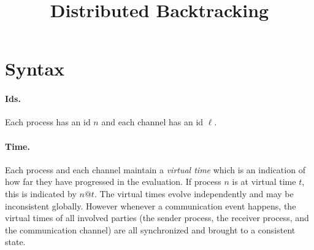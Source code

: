 \documentclass{article}
\title{Distributed Backtracking}
\author{}
\date{}
\begin{document}
\maketitle

\newcommand{\alt}{~|~}
\newcommand{\parc}[2]{#1 \,\|\, #2}
\newcommand{\send}[2]{\texttt{send}~#1~#2}
\newcommand{\stable}[1]{\texttt{stable}~#1}
\newcommand{\stableu}[1]{\underline{\texttt{stable}}~#1}
\newcommand{\backtrack}[1]{\texttt{backtrack}~#1}
\newcommand{\recv}[4]{\texttt{recv}~(#1.#2) \talloblong (#3.#4)}
\newcommand{\proc}[4]{\langle #1@#4:~ #2,#3 \rangle}

\section{Syntax} 

\paragraph*{Ids.} Each process has an id $n$ and each channel has an id
$\ell$.

\paragraph*{Time.} Each process and each channel maintain a \emph{virtual
  time} which is an indication of how far they have progressed in the
evaluation. If process $n$ is at virtual time $t$, this is indicated by
$n@t$. The virtual times evolve independently and may be inconsistent
globally. However whenever a communication event happens, the virtual times
of all involved parties (the sender process, the receiver process, and the
communication channel) are all synchronized and brought to a consistent
state.
\end{document}
